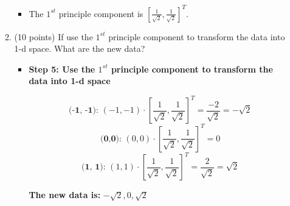 \documentclass[11pt]{article}
\begin{document}
\begin{enumerate}
\begin{enumerate}
\begin{itemize}
            \item The $1^{st}$ principle component is $[\frac{1}{\sqrt{2}}, \frac{1}{\sqrt{2}}]^T$.

        \end{itemize}
        
        \item (10 points) If use the $1^{st}$ principle component
        to transform the data into 1-d space. What are the new
        data?

        \begin{itemize}
            \item \textbf{Step 5: Use the $1^{st}$ principle component
        to transform the data into 1-d space}

            \[\textbf{(-1, -1): } (-1, -1) \cdot [\frac{1}{\sqrt{2}}, \frac{1}{\sqrt{2}}]^T = \frac{-2}{\sqrt{2}} = -\sqrt{2}\]
            \[\textbf{(0,0): } (0,0) \cdot [\frac{1}{\sqrt{2}}, \frac{1}{\sqrt{2}}]^T = 0\]
            \[\textbf{(1, 1): } (1, 1) \cdot [\frac{1}{\sqrt{2}}, \frac{1}{\sqrt{2}}]^T = \frac{2}{\sqrt{2}} = \sqrt{2}\]

        \textbf{The new data is:} $-\sqrt{2}, 0, \sqrt{2}$
            
        \end{itemize}
    

    \end{enumerate}



\end{enumerate}
\end{document}
